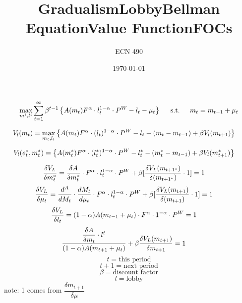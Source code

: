 \documentclass[12pt]{article}
\begin{document}
\title{\vskip-0.6in Gradualism}
\author{ECN 490}
\date{\today}
\maketitle

\title{Lobby}
\[
\max_{m^t,l^t} \sum_{t=1}^\infty \beta^{t-1}\left\{A(m_t)F^\alpha\cdot l^{1-\alpha}_t\cdot P^W-l_t-\mu_t
  \right\} \hskip.2in \text{s.t.} \hskip.2in  m_t=m_{t-1}+\mu_t
\]

 
\title{Bellman Equation}
\[
  V_l(m_t)=\max_{m_t,l_t}\left\{A(m_t)F^\alpha\cdot (l_t)^{1-\alpha}\cdot P^W-l_t-(m_t-m_{t-1})+\beta V_l(m_{t+1})
  \right\} \hskip.2in 
\]
\title{Value Function}
\[
  V_l(e_t^\ast,m_t^\ast)=\left\{A(m_t^\ast)F^\alpha\cdot (l^\ast_t)^{1-\alpha}\cdot P^W-l_t^\ast-(m^\ast_t-m_{t-1})+\beta V_l(m^\ast_{t+1})
  \right\} \hskip.2in
\]
\title{FOCs}
\[\dfrac{\delta V_L}{\delta m_t^\ast}=\dfrac{\delta A}{\delta m^\ast_t} \cdot F^\alpha \cdot l^{1-\alpha}_t \cdot P^W +\beta [\dfrac{\delta V_L(m_{t+1^\ast})}{\delta(m_{t+1^\ast})} \cdot 1] =1
\hskip.2in
\]
\[
\dfrac{\delta V_L}{\delta \mu_t}=\dfrac{d^A}{dM_t} \cdot \dfrac{dM_t}{d\mu_t} \cdot F^\alpha \cdot l_t^{1-\alpha} \cdot P^W + \beta[\dfrac{\delta V_L(m_{t+1})}{\delta(m_{t+1})} \cdot 1] =1
\hskip.2in 
\]
\[
\dfrac{\delta V_L}{\delta l_t}= (1-\alpha) A(m_{t-1}+\mu_t) \cdot F^\alpha \cdot 1^{-\alpha} \cdot P^W =1
\hskip.2in 
\]
\[
\dfrac{\dfrac{\delta A}{\delta m_t} \cdot l^t}{(1-\alpha) A(m_{t+1}+\mu_t)} +\beta \dfrac{\delta V_L (m_{t+1})}{\delta m_{t+1}} =1
\hskip.2in
\]
\[
t=\text{this period}
\]
\[
t+1=\text{next period}
\]
\[
\beta=\text{discount factor}
\]
\[
l=\text{lobby}
\]
note: 1 comes from $\dfrac{\delta m_{t+1}}{\delta \mu}$
\end{document}
